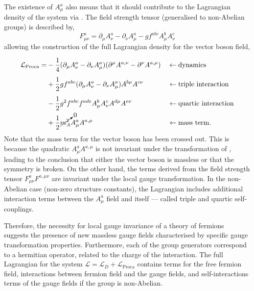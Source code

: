 The existence of $A_\mu^a$ also means that it should contribute to the Lagrangian density of the system via .
The field strength tensor (generalised to non-Abelian groups) is described by,
\begin{equation}
	\label{eq:field_strength_tensor}
	F_{\mu\nu}^a = \partial_\mu A_\nu^a - \partial_\nu A_\mu^a - g f^{abc} A_\mu^b A_\nu^c
\end{equation}
allowing the construction of the full Lagrangian density for the vector boson field,
\begin{align}
	\label{eq:boson}
	\mathcal{L}_\text{Proca} =
	 & \vphantom{\cancelto{0}{m_A^2}} -\frac{1}{4}(\partial_\mu A_\nu^a - \partial_\nu A_\mu^a) (\partial^\mu A^{a,\nu} - \partial^\nu A^{a,\mu}) &  & \leftarrow \text{dynamics}            \\
	 & \vphantom{\cancelto{0}{m_A^2}} + \frac{1}{2} g f^{abc} (\partial_\mu A_\nu^a - \partial_\nu A_\mu^a) A^{b\mu} A^{c\nu}                     &  & \leftarrow \text{triple interaction}  \\
	 & \vphantom{\cancelto{0}{m_A^2}} - \frac{1}{2} g^2 f^{abc} f^{ade} A_\mu^b A_\nu^c A^{d\mu} A^{e\nu}                                         &  & \leftarrow \text{quartic interaction} \\
	 & + \frac{1}{2} \cancelto{0}{m_A^2} A_\mu^a A^{a,\mu}                                                                                        &  & \leftarrow \text{mass term}.
\end{align}
Note that the mass term for the vector boson has been crossed out.
This is because the quadratic $A_\mu^a A^{a,\mu}$ is not invariant under the transformation of , leading to the conclusion that either the vector boson is massless or that the symmetry is broken.
On the other hand, the terms derived from the field strength tensor $F_{\mu\nu}^a F^{a,\mu\nu}$ are invariant under the local gauge transformation.
In the non-Abelian case (non-zero structure constants), the Lagrangian includes additional interaction terms between the $A_\mu^a$ field and itself --- called triple and quartic self-couplings.

Therefore, the necessity for local gauge invariance of a theory of fermions suggests the presence of new massless gauge fields characterised by specific gauge transformation properties.
Furthermore, each of the group generators correspond to a hermitian operator, related to the charge of the interaction.
The full Lagrangian for the system $\mathcal{L} = \mathcal{L}_D + \mathcal{L}_\text{Proca}$ contains terms for the free fermion field, interactions between fermion field and the gauge fields, and self-interactions terms of the gauge fields if the group is non-Abelian.

